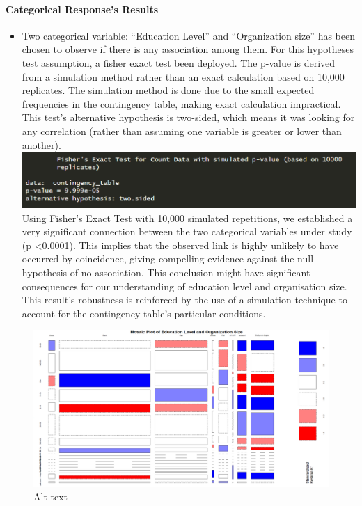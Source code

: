 \documentclass[
  12pt,
]{article}
\providecommand{\tightlist}{%
  \setlength{\itemsep}{0pt}\setlength{\parskip}{0pt}}
\begin{document}
\hypertarget{categorical-responses-results}{%
\paragraph{Categorical Response's
Results}\label{categorical-responses-results}}

\begin{itemize}
\tightlist
\item
  Two categorical variable: ``Education Level'' and ``Organization
  size'' has been chosen to observe if there is any association among
  them. For this hypotheses test assumption, a fisher exact test been
  deployed. The p-value is derived from a simulation method rather than
  an exact calculation based on 10,000 replicates. The simulation method
  is done due to the small expected frequencies in the contingency
  table, making exact calculation impractical. This test's alternative
  hypothesis is two-sided, which means it was looking for any
  correlation (rather than assuming one variable is greater or lower
  than another).
  \includegraphics[width=1\textwidth,height=1\textheight]{fisher-test-result.png}
  Using Fisher's Exact Test with 10,000 simulated repetitions, we
  established a very significant connection between the two categorical
  variables under study (p \textless0.0001). This implies that the
  observed link is highly unlikely to have occurred by coincidence,
  giving compelling evidence against the null hypothesis of no
  association. This conclusion might have significant consequences for
  our understanding of education level and organisation size. This
  result's robustness is reinforced by the use of a simulation technique
  to account for the contingency table's particular conditions.
\end{itemize}

\begin{figure}
\centering
\includegraphics[width=1\textwidth,height=1\textheight]{mosaic-fisher-plot.png}
\caption{Alt text}
\end{figure}
\end{document}
